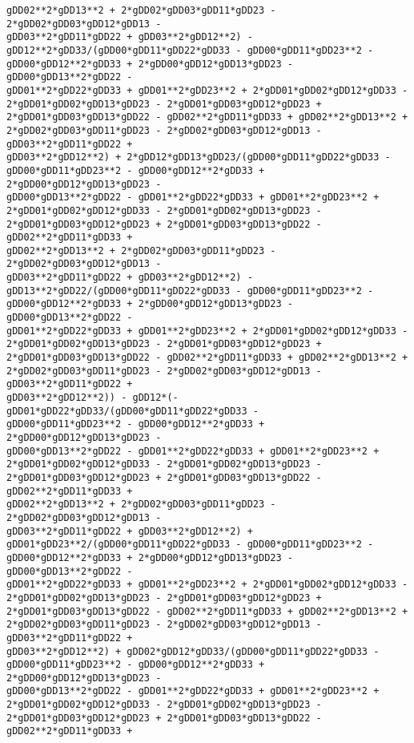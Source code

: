 \documentclass[landscape,letterpaper,10pt,english]{article}
\begin{document}
\begin{Verbatim}[commandchars=\\\{\}]
gDD02**2*gDD13**2 + 2*gDD02*gDD03*gDD11*gDD23 - 2*gDD02*gDD03*gDD12*gDD13 -
gDD03**2*gDD11*gDD22 + gDD03**2*gDD12**2) -
gDD12**2*gDD33/(gDD00*gDD11*gDD22*gDD33 - gDD00*gDD11*gDD23**2 -
gDD00*gDD12**2*gDD33 + 2*gDD00*gDD12*gDD13*gDD23 - gDD00*gDD13**2*gDD22 -
gDD01**2*gDD22*gDD33 + gDD01**2*gDD23**2 + 2*gDD01*gDD02*gDD12*gDD33 -
2*gDD01*gDD02*gDD13*gDD23 - 2*gDD01*gDD03*gDD12*gDD23 +
2*gDD01*gDD03*gDD13*gDD22 - gDD02**2*gDD11*gDD33 + gDD02**2*gDD13**2 +
2*gDD02*gDD03*gDD11*gDD23 - 2*gDD02*gDD03*gDD12*gDD13 - gDD03**2*gDD11*gDD22 +
gDD03**2*gDD12**2) + 2*gDD12*gDD13*gDD23/(gDD00*gDD11*gDD22*gDD33 -
gDD00*gDD11*gDD23**2 - gDD00*gDD12**2*gDD33 + 2*gDD00*gDD12*gDD13*gDD23 -
gDD00*gDD13**2*gDD22 - gDD01**2*gDD22*gDD33 + gDD01**2*gDD23**2 +
2*gDD01*gDD02*gDD12*gDD33 - 2*gDD01*gDD02*gDD13*gDD23 -
2*gDD01*gDD03*gDD12*gDD23 + 2*gDD01*gDD03*gDD13*gDD22 - gDD02**2*gDD11*gDD33 +
gDD02**2*gDD13**2 + 2*gDD02*gDD03*gDD11*gDD23 - 2*gDD02*gDD03*gDD12*gDD13 -
gDD03**2*gDD11*gDD22 + gDD03**2*gDD12**2) -
gDD13**2*gDD22/(gDD00*gDD11*gDD22*gDD33 - gDD00*gDD11*gDD23**2 -
gDD00*gDD12**2*gDD33 + 2*gDD00*gDD12*gDD13*gDD23 - gDD00*gDD13**2*gDD22 -
gDD01**2*gDD22*gDD33 + gDD01**2*gDD23**2 + 2*gDD01*gDD02*gDD12*gDD33 -
2*gDD01*gDD02*gDD13*gDD23 - 2*gDD01*gDD03*gDD12*gDD23 +
2*gDD01*gDD03*gDD13*gDD22 - gDD02**2*gDD11*gDD33 + gDD02**2*gDD13**2 +
2*gDD02*gDD03*gDD11*gDD23 - 2*gDD02*gDD03*gDD12*gDD13 - gDD03**2*gDD11*gDD22 +
gDD03**2*gDD12**2)) - gDD12*(-gDD01*gDD22*gDD33/(gDD00*gDD11*gDD22*gDD33 -
gDD00*gDD11*gDD23**2 - gDD00*gDD12**2*gDD33 + 2*gDD00*gDD12*gDD13*gDD23 -
gDD00*gDD13**2*gDD22 - gDD01**2*gDD22*gDD33 + gDD01**2*gDD23**2 +
2*gDD01*gDD02*gDD12*gDD33 - 2*gDD01*gDD02*gDD13*gDD23 -
2*gDD01*gDD03*gDD12*gDD23 + 2*gDD01*gDD03*gDD13*gDD22 - gDD02**2*gDD11*gDD33 +
gDD02**2*gDD13**2 + 2*gDD02*gDD03*gDD11*gDD23 - 2*gDD02*gDD03*gDD12*gDD13 -
gDD03**2*gDD11*gDD22 + gDD03**2*gDD12**2) +
gDD01*gDD23**2/(gDD00*gDD11*gDD22*gDD33 - gDD00*gDD11*gDD23**2 -
gDD00*gDD12**2*gDD33 + 2*gDD00*gDD12*gDD13*gDD23 - gDD00*gDD13**2*gDD22 -
gDD01**2*gDD22*gDD33 + gDD01**2*gDD23**2 + 2*gDD01*gDD02*gDD12*gDD33 -
2*gDD01*gDD02*gDD13*gDD23 - 2*gDD01*gDD03*gDD12*gDD23 +
2*gDD01*gDD03*gDD13*gDD22 - gDD02**2*gDD11*gDD33 + gDD02**2*gDD13**2 +
2*gDD02*gDD03*gDD11*gDD23 - 2*gDD02*gDD03*gDD12*gDD13 - gDD03**2*gDD11*gDD22 +
gDD03**2*gDD12**2) + gDD02*gDD12*gDD33/(gDD00*gDD11*gDD22*gDD33 -
gDD00*gDD11*gDD23**2 - gDD00*gDD12**2*gDD33 + 2*gDD00*gDD12*gDD13*gDD23 -
gDD00*gDD13**2*gDD22 - gDD01**2*gDD22*gDD33 + gDD01**2*gDD23**2 +
2*gDD01*gDD02*gDD12*gDD33 - 2*gDD01*gDD02*gDD13*gDD23 -
2*gDD01*gDD03*gDD12*gDD23 + 2*gDD01*gDD03*gDD13*gDD22 - gDD02**2*gDD11*gDD33 +

\end{Verbatim}
\end{document}
